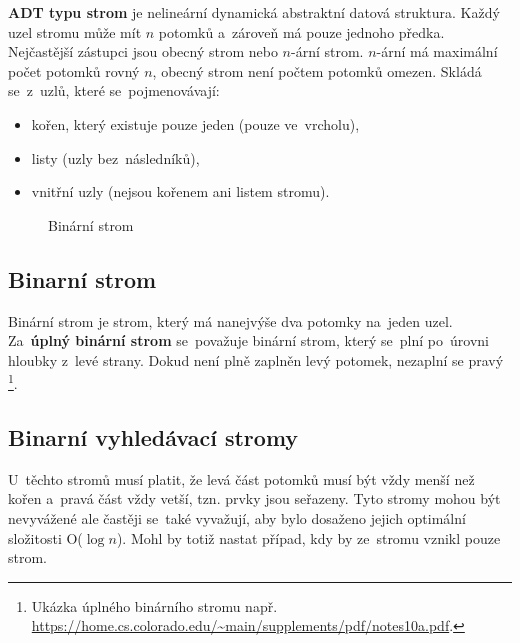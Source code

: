 \textbf{ADT typu strom} je nelineární dynamická abstraktní datová struktura. Každý uzel stromu může mít $n$ potomků a~zároveň má pouze jednoho předka. Nejčastější zástupci jsou obecný strom nebo $n$-ární strom. $n$-ární má maximální počet potomků rovný $n$, obecný strom není počtem potomků omezen. Skládá se~z~uzlů, které se~pojmenovávají:

\begin{itemize}
	\item kořen, který existuje pouze jeden (pouze ve~vrcholu),
	\item listy (uzly bez~následníků),
	\item vnitřní uzly (nejsou kořenem ani listem stromu).
\end{itemize}

\begin{figure}[ht]
	\centering
	\caption{Binární strom}
\end{figure}

\subsection{Binarní strom}

Binární strom je strom, který má nanejvýše dva potomky na~jeden uzel. Za~\textbf{úplný binární strom} se~považuje binární strom, který se~plní po~úrovni hloubky z~levé strany. Dokud není plně zaplněn levý potomek, nezaplní se pravý%
\footnote{Ukázka úplného binárního stromu např. \url{https://home.cs.colorado.edu/~main/supplements/pdf/notes10a.pdf}.}.

\subsection{Binarní vyhledávací stromy}

U~těchto stromů musí platit, že levá část potomků musí být vždy menší než kořen a~pravá část vždy vetší, tzn. prvky jsou seřazeny. Tyto stromy mohou být nevyvážené ale častěji se~také vyvažují, aby bylo dosaženo jejich optimální složitosti O($\log{n}$). Mohl by totiž nastat případ, kdy by ze~stromu vznikl pouze strom.

